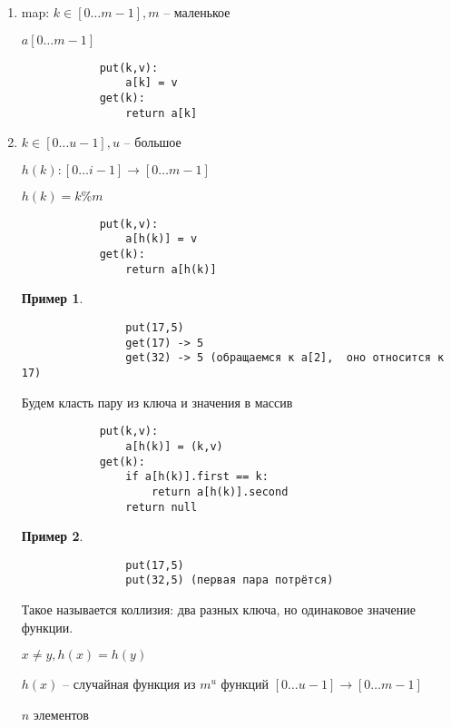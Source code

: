 \documentclass{book}
\theoremstyle{definition}
\newtheorem*{example}{Пример}
\begin{document}
\begin{enumerate}
    \item map: $k\in [0\ldots m-1], m$ -- маленькое

        $a[0\ldots m-1]$ 

        \begin{verbatim}
            put(k,v):
                a[k] = v
            get(k):
                return a[k]
        \end{verbatim}
    \item $k\in [0\ldots u-1], u$ -- большое

        $h(k):[0\ldots i-1] \to [0 \ldots m-1]$

        $h(k) = k \% m$

         \begin{verbatim}
            put(k,v):
                a[h(k)] = v
            get(k):
                return a[h(k)]
        \end{verbatim}

        \begin{example}
            \begin{verbatim}
                put(17,5)
                get(17) -> 5
                get(32) -> 5 (обращаемся к a[2],  оно относится к 17)
            \end{verbatim}
        \end{example}

        Будем класть пару из ключа и значения в массив

        \begin{verbatim}
            put(k,v):
                a[h(k)] = (k,v)
            get(k):
                if a[h(k)].first == k:
                    return a[h(k)].second
                return null
        \end{verbatim}

        \begin{example}
            \begin{verbatim}
                put(17,5)
                put(32,5) (первая пара потрётся)
            \end{verbatim}
            Такое называется коллизия: два разных ключа, но одинаковое значение функции.

            $x\neq y,h(x) = h(y)$
        \end{example}

        $h(x)$ -- случайная функция из $m^u$ функций  $[0\ldots u-1] \to [0\ldots m-1]$

        $n$ элементов


\end{enumerate}
\end{document}
